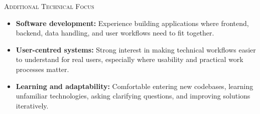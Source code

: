 \documentclass[11pt, a4paper]{article}
\newcommand{\headright}[1]{\vspace*{2.5ex}\textsc{\Large\color{gray}#1}\par%
\vspace*{-2ex}{\color{gray}\hrulefill}\par}
\begin{document}
\headright{Additional Technical Focus}
\begin{itemize}
\item \textbf{Software development:} Experience building applications where frontend, backend, data handling, and user workflows need to fit together.
\item \textbf{User-centred systems:} Strong interest in making technical workflows easier to understand for real users, especially where usability and practical work processes matter.
\item \textbf{Learning and adaptability:} Comfortable entering new codebases, learning unfamiliar technologies, asking clarifying questions, and improving solutions iteratively.
\end{itemize}
\end{document}
